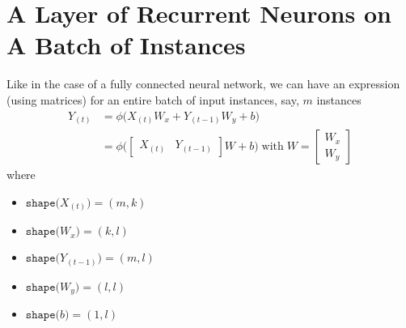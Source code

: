\documentclass{article}
\begin{document}
\section{A Layer of Recurrent Neurons on A Batch of Instances}
Like in the case of a fully connected neural network, we can have an expression (using matrices) for
an entire batch of input instances, say, $m$ instances
\begin{align*}
  Y_{(t)} &= \phi\bigg(
    X_{(t)} W_x
    + Y_{(t-1)} W_y
    + b
  \bigg) \\
          &= \phi\bigg(
            \begin{bmatrix}
              X_{(t)} & Y_{(t-1)}
            \end{bmatrix}
            W + b
  \bigg)\; \text{with}\; W = \begin{bmatrix}
                           W_x \\
                           W_y
                         \end{bmatrix}
\end{align*}
where
\begin{itemize}
  \item $\texttt{shape(} X_{(t)}\texttt{)}= (m, k)$
  \item $\texttt{shape(} W_{x}\texttt{)}= (k, l)$
  \item $\texttt{shape(} Y_{(t-1)}\texttt{)}= (m, l)$
  \item $\texttt{shape(} W_{y}\texttt{)}= (l, l)$
  \item $\texttt{shape(} b\texttt{)}= (1, l)$
\end{itemize}
\end{document}
